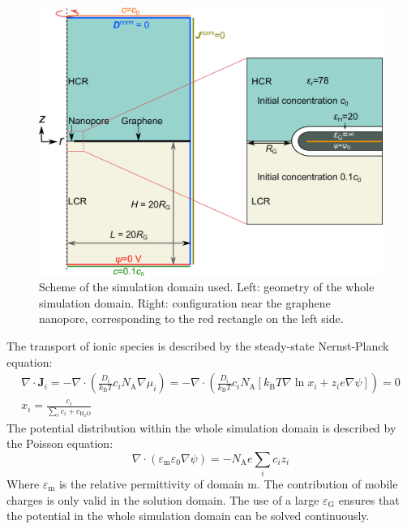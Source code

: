 \documentclass[manuscript=suppinfo,email=true, hyperref=true, keywords=false]{achemso}
\begin{document}
\begin{figure}[htbp]
  \centering
  \includegraphics[width=0.8\linewidth]{img/SI-numerical-1.png}
  \caption{Scheme of the simulation domain used. Left: geometry of the
    whole simulation domain. Right: configuration near the graphene
    nanopore, corresponding to the red rectangle on the left side.}
  \label{fig:scheme}
\end{figure}

The transport of ionic species is described by the steady-state
Nernst-Planck equation:
\begin{eqnarray}
  \label{eq:pnp}
  \nabla \cdot \boldsymbol{J}_{i} = -\nabla \cdot \left( \frac{D_{i}}{k_{\mathrm{B}}T} c_{i} N_{\mathrm{A}} \nabla \mu_{i}\right)
  = -\nabla \cdot \left( \frac{D_{i}}{k_{\mathrm{B}} T} c_{i} N_{\mathrm{A}}
  [k_{\mathrm{B}}T \nabla \ln x_{i} + z_{i} e \nabla \psi]\right) = 0\\
  x_{i} = \frac{c_{i}}{\sum_{i} c_{i} + c_{\mathrm{H_{2}O}}}
\end{eqnarray}
The potential distribution within the whole simulation domain is
described by the Poisson equation:
\begin{equation}
  \label{eq:poisson}
  \nabla \cdot (\varepsilon_{\mathrm{m}} \varepsilon_{0} \nabla \psi) = -N_{\mathrm{A}} e \sum_{i} c_{i}z_{i}
\end{equation}
Where $\varepsilon_{\mathrm{m}}$ is the relative permittivity of
domain m. The contribution of mobile charges is only valid in the
solution domain. The use of a large $\varepsilon_{\mathrm{G}}$ ensures
that the potential in the whole simulation domain can be solved
continuously. 
\end{document}
